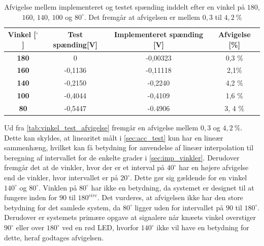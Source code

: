 \begin{table}[H]
\centering
\begin{tabular}{|c|c|c|c|}
\hline
\textbf{Vinkel {[}{$^{\circ}$}{]}} & \textbf{Test spænding{[}V{]}} & \textbf{Implementeret spænding {[}V{]}} & \textbf{Afvigelse {[}\%{]}} \\ \hline
\textbf{180}                    & 0                         & -0,00323                       & 0,3 \%                      \\ \hline
\textbf{160}                    & -0,1136                   & -0,11118                       & 2,1\%                       \\ \hline
\textbf{140}                    & -0,2150                   & -0,2240                        & 4,2 \%                      \\ \hline
\textbf{100}                    & -0,4044                   & -0,4109                        & 1,6 \%                      \\ \hline
\textbf{80}                     & -0,5447                   & -0.4906                        & 3, 4 \%                    \\ \hline
\end{tabular}
\caption{Afvigelse mellem implementeret og testet spænding inddelt efter en vinkel på $180$, $160$, $140$, $100$ og $80^{\circ}$. Det fremgår at afvigelsen er mellem $0,3$ til $4,2~\%$}
\label{tab:vinkel_test_afvigelse}
\end{table}

\noindent
Ud fra \autoref{tab:vinkel_test_afvigelse} fremgår en afvigelse mellem $0,3$ og $4,2~\%$. Dette kan skyldes, at linearitet målt i \autoref{sec:acc_test} kun har en lineær sammenhæng, hvilket kan få betydning for anvendelse af lineær interpolation til beregning af intervallet for de enkelte grader i \autoref{sec:imp_vinkler}. Derudover fremgår det at de vinkler, hvor der er et interval på $40^{\circ}$ har en højere afvigelse end de vinkler, hvor intervallet er på $20^{\circ}$. Dette gør sig gældende for en vinkel $140^{\circ}$ og $80^{\circ}$. Vinklen på $80^{\circ}$ har ikke en betydning, da systemet er designet til at fungere inden for $90$ til $180^{circ}$.
Det vurderes, at afvigelsen ikke har den store betydning for det samlede system, da $80^{\circ}$ ligger uden for intervallet på $90$ til $180^{\circ}$. Derudover er systemets primære opgave at signalere når knæets vinkel overstiger $90^{\circ}$ eller over $180^{\circ}$ ved en rød LED, hvorfor $140^{\circ}$ ikke vil have en betydning for dette, heraf godtages afvigelsen. 

